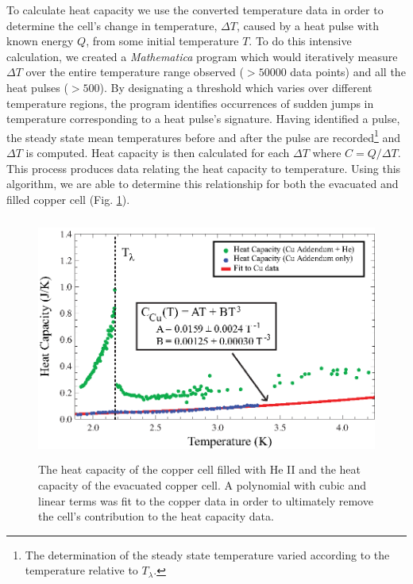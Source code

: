 To calculate heat capacity we use the converted temperature data in order to determine the cell's change in temperature, $\Delta T$, caused by a heat pulse with known energy $Q$, from some initial temperature $T$. To do this intensive calculation, we created a \emph{Mathematica} program which would iteratively measure $\Delta T$ over the entire temperature range observed ($>50000$ data points) and all the heat pulses ($>500$). By designating a threshold which varies over different temperature regions, the program identifies occurrences of sudden jumps in temperature corresponding to a heat pulse's signature. Having identified a pulse, the steady state mean temperatures before and after the pulse are recorded\footnote{The determination of the steady state temperature varied according to the temperature relative to $T_{\lambda}$.} and $\Delta T$ is computed.  Heat capacity is then calculated for each $\Delta T$ where $C=Q/\Delta T$.  This process produces data relating the heat capacity to temperature.  Using this algorithm, we are able to determine this relationship for both the evacuated and filled copper cell (Fig. \ref{fig:lambdanorm}).
\begin{figure}[htbp]
\begin{center}
\includegraphics[height=80mm]{./figures/lambdanorm.eps}
\caption{\small{The heat capacity of the copper cell filled with He II and the heat capacity of the evacuated copper cell.  A polynomial with cubic and linear terms was fit to the copper data in order to ultimately remove the cell's contribution to the heat capacity data.}}
\label{fig:lambdanorm}
\end{center}
\end{figure}

